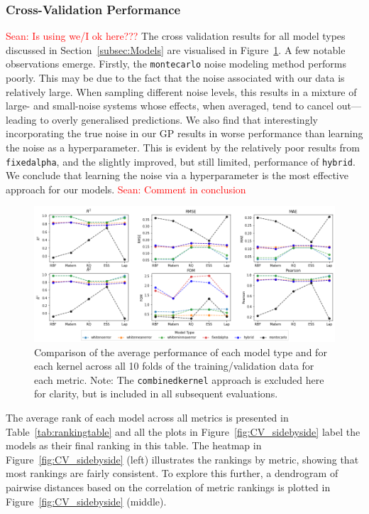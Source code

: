 \documentclass[10pt]{article}
\newcommand{\Sean}[1]{{\textcolor{red}{{Sean: #1}} }}
\begin{document}
\subsubsection*{Cross-Validation Performance}
\Sean{Is using we/I ok here???}
The cross validation results for all model types discussed in Section~\ref{subsec:Models} are visualised in Figure~\ref{fig:broad_comparison}. A few notable observations emerge. Firstly, the \texttt{montecarlo} noise modeling method performs poorly.
This may be due to the fact that the noise associated with our data is relatively large. When sampling different noise levels, this results in a mixture of large- and small-noise systems whose effects, when averaged, tend to cancel out—leading to overly generalised predictions.
We also find that interestingly incorporating the true noise in our GP results in worse performance than learning the noise as a hyperparameter.
This is evident by the relatively poor results from \texttt{fixedalpha}, and the slightly improved, but still limited, performance of \texttt{hybrid}.
We conclude that learning the noise via a hyperparameter is the most effective approach for our models. \Sean{Comment in conclusion}
\begin{figure}[H]
    \centering
    \includegraphics[width=\textwidth]{LatexPlots/CV_plots/metrics_compared.png}
    \caption{Comparison of the average performance of each model type and for each kernel across all 10 folds of the training/validation data for each metric. Note: The \texttt{combinedkernel} approach is excluded here for clarity, but is included in all subsequent evaluations.}
    \label{fig:broad_comparison}
\end{figure}
The average rank of each model across all metrics is presented in Table~\ref{tab:rankingtable} and all the plots in Figure~\ref{fig:CV_sidebyside} label the models as their final ranking in this table.
The heatmap in Figure~\ref{fig:CV_sidebyside} (left) illustrates the rankings by metric, showing that most rankings are fairly consistent. To explore this further, a dendrogram of pairwise distances based on the correlation of metric rankings is plotted in Figure~\ref{fig:CV_sidebyside} (middle).
\end{document}
